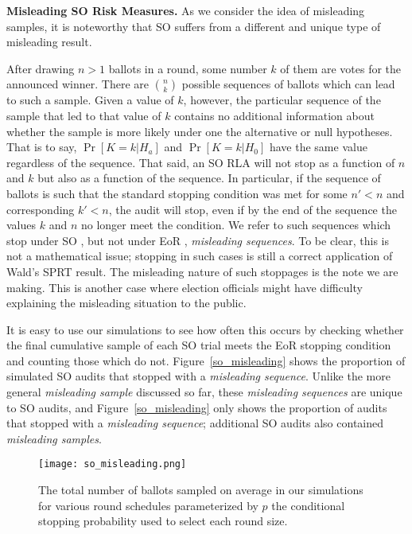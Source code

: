 \textbf{Misleading SO Risk Measures.} As we consider the idea of misleading samples, it is noteworthy that SO \BRAVO suffers from a different and unique type of misleading result. 

After drawing $n>1$ ballots in a round, some number $k$ of them are votes for the announced winner. There are $\binom{n}{k}$ possible sequences of ballots which can lead to such a sample. Given a value of $k$, however, the particular sequence of the sample that led to that value of $k$ contains no additional information about whether the sample is more likely under one the alternative or null hypotheses. That is to say, $\Pr[K=k|H_a]$ and $\Pr[K=k|H_0]$ have the same value regardless of the sequence.
That said, an SO \BRAVO RLA will not stop as a function of $n$ and $k$ but also as a function of the sequence. In particular, if the sequence of ballots is such that the standard \BRAVO stopping condition was met for some $n'<n$ and corresponding $k'<n$, the audit will stop, even if by the end of the sequence the values $k$ and $n$ no longer meet the \BRAVO condition. We refer to such sequences which stop under SO \BRAVO, but not under EoR \BRAVO, \emph{misleading sequences}. To be clear, this is not a mathematical issue; stopping in such cases is still a correct application of Wald's SPRT result. The misleading nature of such stoppages is the note we are making. This is another case where election officials might have difficulty explaining the misleading situation to the public.

It is easy to use our simulations to see how often this occurs by checking whether the final cumulative sample of each SO \BRAVO trial meets the EoR \BRAVO stopping condition and counting those which do not. Figure~\ref{so_misleading} shows the proportion of simulated SO \BRAVO audits that stopped with a \emph{misleading sequence}. Unlike the more general \emph{misleading sample} discussed so far, these \emph{misleading sequences} are unique to SO \BRAVO audits, and Figure~\ref{so_misleading} only shows the proportion of audits that stopped with a \emph{misleading sequence}; additional SO \BRAVO audits also contained \emph{misleading samples}.

\begin{figure}
\texttt{[image: so\_misleading.png]}
\caption{The total number of ballots sampled on average in our simulations for various round schedules parameterized by $p$ the conditional stopping probability used to select each round size.}
\label{fig:avg_bals}
\end{figure}




